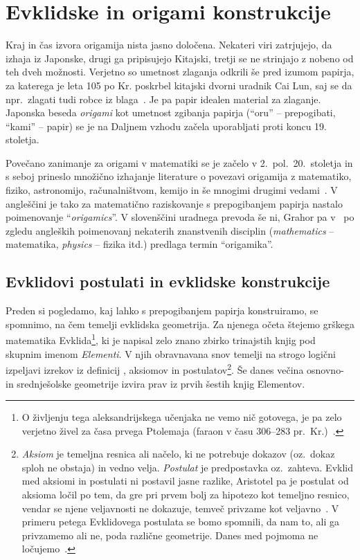 \section{Evklidske in origami konstrukcije}
\label{pogl:aksiomi}

Kraj in čas izvora origamija nista jasno določena. Nekateri viri zatrjujejo, da izhaja iz Japonske, drugi ga pripisujejo Kitajski, tretji se ne strinjajo z nobeno od teh dveh možnosti. Verjetno so umetnost zlaganja odkrili še pred izumom papirja, za katerega je leta 105 po Kr. poskrbel kitajski dvorni uradnik Cai Lun, saj se da npr.\ zlagati tudi robce iz blaga~\cite{robinson2024}. Je pa papir idealen material za zlaganje. Japonska beseda \emph{origami} kot umetnost zgibanja papirja (``oru'' -- prepogibati, ``kami'' -- papir) se je na Daljnem vzhodu začela uporabljati proti koncu 19. stoletja.

Povečano zanimanje za origami v matematiki se je začelo v 2.\ pol.\ 20.\ stoletja in s seboj prineslo množično izhajanje literature o povezavi origamija z matematiko, fiziko, astronomijo, računalništvom, kemijo in še mnogimi drugimi vedami~\cite{zore2022}. V angleščini je tako za matematično raziskovanje s prepogibanjem papirja nastalo poimenovanje ``\emph{origamics}''. V slovenščini uradnega prevoda še ni, Grahor pa v~\cite[str.\ 5]{sgv2016} po zgledu angleških poimenovanj nekaterih znanstvenih disciplin (\emph{mathematics} -- matematika, \emph{physics} -- fizika itd.) predlaga termin ``origamika''.

\subsection{Evklidovi postulati in evklidske konstrukcije}

Preden si pogledamo, kaj lahko s prepogibanjem papirja konstruiramo, se spomnimo, na čem temelji evklidska geometrija. Za njenega očeta štejemo grškega matematika Evklida\footnote{O življenju tega aleksandrijskega učenjaka ne vemo nič gotovega, je pa zelo verjetno živel za časa prvega Ptolemaja (faraon v času 306--283 pr.\ Kr.)~\cite[str.\ 61]{struik1986}.}, ki je napisal zelo znano zbirko trinajstih knjig pod skupnim imenom \emph{Elementi}. V njih obravnavana snov temelji na strogo logični izpeljavi izrekov iz definicij%
, aksiomov in postulatov\footnote{\emph{Aksiom} je temeljna resnica ali načelo, ki ne potrebuje dokazov (oz.\ dokaz sploh ne obstaja) in vedno velja. \emph{Postulat} je predpostavka oz.\ zahteva. Evklid med aksiomi in postulati ni postavil jasne razlike, Aristotel pa je postulat od aksioma ločil po tem, da gre pri prvem bolj za hipotezo kot temeljno resnico, vendar se njene veljavnosti ne dokazuje, temveč privzame kot veljavno~\cite[str.\ 122]{euclidI}. V primeru petega Evklidovega postulata se bomo spomnili, da nam to, ali ga privzamemo ali ne, poda različne geometrije. Danes med pojmoma ne ločujemo~\cite[str.\ 2]{geometricconstructions}.}. Še danes večina osnovno- in srednješolske geometrije izvira prav iz prvih šestih knjig Elementov.

